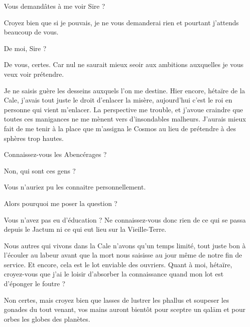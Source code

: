 \scene



\StageDirII{\elena, \ela}



\begin{drama}
  \elaspeaks Vous demandâtes à me voir Sire ?

  \elenaspeaks Croyez bien que si je pouvais, je ne vous demanderai rien et pourtant j’attends beaucoup de vous.

  \elaspeaks De moi, Sire ?

  \elenaspeaks De vous, certes. Car nul ne saurait mieux seoir aux ambitions auxquelles je vous veux voir prétendre.

  \elaspeaks Je ne saisis guère les desseins auxquels l’on me destine. Hier encore, hétaïre de la Cale, j’avais tout juste le droit d’enlacer la misère, aujourd’hui c’est le roi en personne qui vient m’enlacer. La perspective me trouble, et j’avoue craindre que toutes ces manigances ne me mènent vers d’insondables malheurs. J’aurais mieux fait de me tenir à la place que m’assigna le Cosmos au lieu de prétendre à des sphères trop hautes.

  \elenaspeaks Connaissez-vous les Abencérages ?

  \elaspeaks Non, qui sont ces gens ?

  \elenaspeaks {} Vous n’auriez pu les connaitre personnellement. 

  \elaspeaks Alors pourquoi me poser la question ?

  \elenaspeaks Vous n’avez pas eu d’éducation ? Ne connaissez-vous donc rien de ce qui se passa depuis le Jactum ni ce qui eut lieu sur la Vieille-Terre.

  \elaspeaks Nous autres qui vivons dans la Cale n’avons qu’un temps limité, tout juste bon à l’écouler au labeur avant que la mort nous saisisse au jour même de notre fin de service. Et encore, cela est le lot enviable des ouvriers. Quant à moi, hétaïre, croyez-vous que j’ai le loisir d’absorber la connaissance quand mon lot  est d’éponger le foutre ?

  \elenaspeaks Non certes, mais croyez bien que lasses de lustrer les phallus et soupeser les gonades du tout venant, vos mains auront bientôt pour sceptre un qalām et pour orbes les globes des planètes.


\end{drama}
